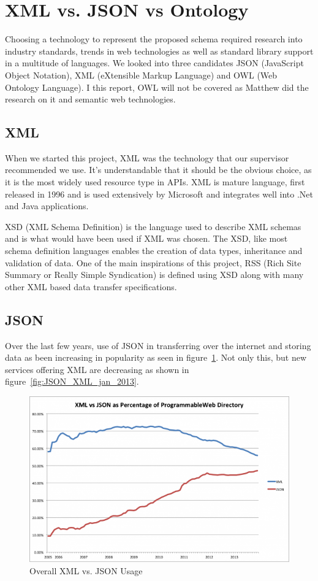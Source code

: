 \documentclass{article}
\begin{document}
\section{XML vs. JSON vs Ontology}
Choosing a technology to represent the proposed schema required research into industry standards, trends in web technologies as well as standard library support in a multitude of languages. We looked into three candidates JSON (JavaScript Object Notation), XML (eXtensible Markup Language) and OWL (Web Ontology Language). I this report, OWL will not be covered as Matthew did the research on it and semantic web technologies.

\subsection{XML}
When we started this project, XML was the technology that our supervisor recommended we use. It's understandable that it should be the obvious choice, as it is the most widely used resource type in APIs\cite{maleshkova2010investigating}. XML is mature language, first released in 1996 and is used extensively by Microsoft and integrates well into .Net and Java applications.

XSD (XML Schema Definition) is the language used to describe XML schemas and is what would have been used if XML was chosen. The XSD, like most schema definition languages enables the creation of data types, inheritance and validation of data. One of the main inspirations of this project, RSS (Rich Site Summary or Really Simple Syndication) is defined using XSD along with many other XML based data transfer specifications.

\subsection{JSON}
Over the last few years, use of JSON in transferring over the internet and storing data as been increasing in popularity as seen in figure~\ref{fig:JSON_XML_all_time}. Not only this, but new services offering XML are decreasing as shown in figure~\ref{fig:JSON_XML_jan_2013}.

\begin{figure}[h]
	\centering
	\includegraphics[scale=0.37]{images/xml_json_all_time.png}
	\caption{Overall XML vs. JSON Usage\protect\cite{duvander2013json}}
	\label{fig:JSON_XML_all_time}
\end{figure}
\end{document}
